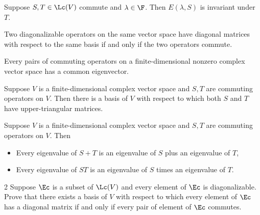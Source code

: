 \documentclass{extarticle}
\begin{document}
\begin{lemma}
    Suppose \(S, T \in \Lc(V)\) commute and \(\lambda \in \F\). Then 
    \(E(\lambda, S)\) is invariant under \(T\).
\end{lemma}

\begin{thm}
    Two diagonalizable operators on the same vector space have diagonal matrices with 
    respect to the same basis if and only if the two operators commute.
\end{thm}

\begin{lemma}
    Every pairs of commuting operators on a finite-dimensional nonzero complex vector space has 
    a common eigenvector.
\end{lemma}

\begin{lemma}
    Suppose \(V\) is a finite-dimensional complex vector space and \(S, T\) are commuting operators on 
    \(V\). Then there is a basis of \(V\) with respect to which both 
    \(S\) and \(T\) have upper-triangular matrices. 
\end{lemma}

\begin{thm}
    Suppose \(V\) is a finite-dimensional complex vector space and \(S, T\) are commuting operators 
    on \(V\). Then 
    \begin{itemize}
        \item Every eigenvalue of \(S + T\) is an eigenvalue of \(S\) plus an eigenvalue of \(T\), 
        \item Every eigenvalue of \(ST\) is an eigenvalue of \(S\) times an eigenvalue of \(T\).
    \end{itemize}
\end{thm}


\newpage 
{}

\begin{problem}{2}
    Suppose \(\Ec\) is a subset of \(\Lc(V)\) and every element of \(\Ec\) is diagonalizable. Prove that 
    there exists a basis of \(V\) with respect to which every element of \(\Ec\) has a diagonal matrix 
    if and only if every pair of element of \(\Ec\) commutes.
\end{problem}
\end{document}
